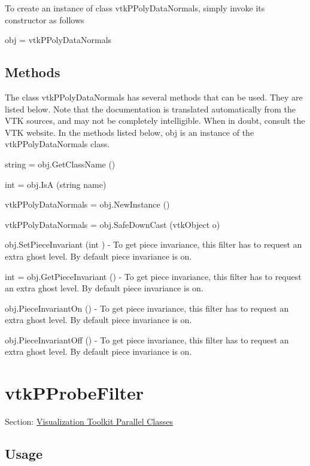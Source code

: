 To create an instance of class vtk\-P\-Poly\-Data\-Normals, simply invoke its constructor as follows \begin{DoxyVerb}  obj = vtkPPolyDataNormals
\end{DoxyVerb}
 \hypertarget{vtkwidgets_vtkxyplotwidget_Methods}{}\subsection{Methods}\label{vtkwidgets_vtkxyplotwidget_Methods}
The class vtk\-P\-Poly\-Data\-Normals has several methods that can be used. They are listed below. Note that the documentation is translated automatically from the V\-T\-K sources, and may not be completely intelligible. When in doubt, consult the V\-T\-K website. In the methods listed below, {\ttfamily obj} is an instance of the vtk\-P\-Poly\-Data\-Normals class. 
\begin{DoxyItemize}
\item {\ttfamily string = obj.\-Get\-Class\-Name ()}  
\item {\ttfamily int = obj.\-Is\-A (string name)}  
\item {\ttfamily vtk\-P\-Poly\-Data\-Normals = obj.\-New\-Instance ()}  
\item {\ttfamily vtk\-P\-Poly\-Data\-Normals = obj.\-Safe\-Down\-Cast (vtk\-Object o)}  
\item {\ttfamily obj.\-Set\-Piece\-Invariant (int )} -\/ To get piece invariance, this filter has to request an extra ghost level. By default piece invariance is on.  
\item {\ttfamily int = obj.\-Get\-Piece\-Invariant ()} -\/ To get piece invariance, this filter has to request an extra ghost level. By default piece invariance is on.  
\item {\ttfamily obj.\-Piece\-Invariant\-On ()} -\/ To get piece invariance, this filter has to request an extra ghost level. By default piece invariance is on.  
\item {\ttfamily obj.\-Piece\-Invariant\-Off ()} -\/ To get piece invariance, this filter has to request an extra ghost level. By default piece invariance is on.  
\end{DoxyItemize}\hypertarget{vtkparallel_vtkpprobefilter}{}\section{vtk\-P\-Probe\-Filter}\label{vtkparallel_vtkpprobefilter}
Section\-: \hyperlink{sec_vtkparallel}{Visualization Toolkit Parallel Classes} \hypertarget{vtkwidgets_vtkxyplotwidget_Usage}{}\subsection{Usage}\label{vtkwidgets_vtkxyplotwidget_Usage}
